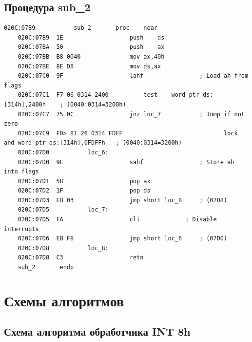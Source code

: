 \documentclass[a4paper,14pt]{article}
\begin{document}
\subsection{Процедура sub\_2}
\begin{lstlisting}[style={asm}, caption={Листинг процедуры sub\_2}]
	020C:07B9			sub_2		proc	near
	020C:07B9  1E					push	ds
	020C:07BA  50					push	ax
	020C:07BB  B8 0040				mov	ax,40h
	020C:07BE  8E D8				mov	ds,ax
	020C:07C0  9F					lahf				; Load ah from flags
	020C:07C1  F7 06 0314 2400			test	word ptr ds:[314h],2400h	; (0040:0314=3200h)
	020C:07C7  75 0C				jnz	loc_7			; Jump if not zero
	020C:07C9  F0> 81 26 0314 FDFF	                           lock	and	word ptr ds:[314h],0FDFFh	; (0040:0314=3200h)
	020C:07D0			loc_6:
	020C:07D0  9E					sahf				; Store ah into flags
	020C:07D1  58					pop	ax
	020C:07D2  1F					pop	ds
	020C:07D3  EB 03				jmp	short loc_8		; (07D8)
	020C:07D5			loc_7:
	020C:07D5  FA					cli				; Disable interrupts
	020C:07D6  EB F8				jmp	short loc_6		; (07D0)
	020C:07D8			loc_8:
	020C:07D8  C3					retn
	sub_2		endp
\end{lstlisting}
\section{Схемы алгоритмов}
\subsection{Схема алгоритма обработчика INT 8h}
\end{document}
